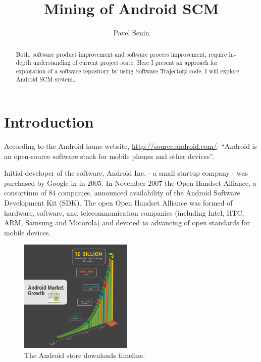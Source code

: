 \documentclass[a4paper,10pt]{article}
\numberwithin{equation}{subsection}
\begin{document}
\title{Mining of Android SCM}
\author{Pavel Senin}

\maketitle

\begin{abstract}
Both, software product improvement and software process improvement, require in-depth understanding 
of current project state. Here I present an approach for exploration of a software repository by 
using Software Trajectory code. I will explore Android SCM system\ldots
\end{abstract}

\section{Introduction}
According to the Android home website, \url{http://source.android.com/}: ``Android is an 
open-source software stack for mobile phones and other devices''.

Initial developer of the software, Android Inc. - a small startup company - was purchased by Google 
in in 2005. In November 2007 the Open Handset Alliance, a consortium of 84 companies, announced 
availability of the Android Software Development Kit (SDK). The open Open Handset Alliance was formed 
of hardware, software, and telecommunication companies (including Intel, HTC, ARM, Samsung and Motorola)
and devoted to advancing of open standards for mobile devices. 

\begin{figure}
   \begin{center}
   \includegraphics[scale=0.3,width=0.48\textwidth]{graph_only_3}
   \end{center}
   \caption{The Android store downloads timeline.}
   \label{fig:android_downloads}
\end{figure}
\end{document}
